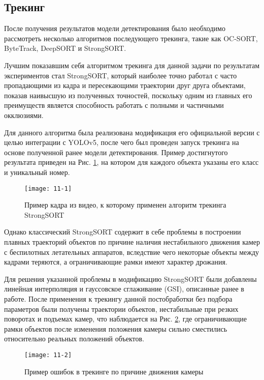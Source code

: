 \subsection{Трекинг}

После получения результатов модели детектирования было необходимо рассмотреть несколько алгоритмов последующего трекинга, такие как OC-SORT, ByteTrack, DeepSORT и StrongSORT.

Лучшим показавшим себя алгоритмом трекинга для данной задачи по результатам экспериментов стал StrongSORT, который наиболее точно работал с часто пропадающими из кадра и пересекающими траектории друг друга объектами, показав наивысшую из полученных точностей, поскольку одним из главных его преимуществ является способность работать с полными и частичными окклюзиями.

Для данного алгоритма была реализована модификация его официальной версии с целью интеграции с YOLOv5, после чего был проведен запуск трекинга на основе полученной ранее модели детектирования. Пример достигнутого результата приведен на Рис. \ref{img:11-1}, на котором для каждого объекта указаны его класс и уникальный номер.

\vspace{0.5cm}

\begin{figure}[ht]
    \centering
    \texttt{[image: 11-1]}
    \caption{Пример кадра из видео, к которому применен алгоритм трекинга StrongSORT}
    \label{img:11-1}
\end{figure}

Однако классический StrongSORT содержит в себе проблемы в построении плавных траекторий объектов по причине наличия нестабильного движения камер с беспилотных летательных аппаратов, вследствие чего некоторые объекты между кадрами теряются, а ограничивающие рамки имеют характер дрожания.

Для решения указанной проблемы в модификацию StrongSORT были добавлены линейная интерполяция и гауссовское сглаживание (GSI), описанные ранее в работе. После применения к трекингу данной постобработки без подбора параметров были получены траектории объектов, нестабильные при резких поворотах и подъемах камер, что наблюдается на Рис. \ref{img:11-2}, где ограничивающие рамки объектов после изменения положения камеры сильно сместились относительно реальных положений объектов.

\vspace{0.5cm}

\begin{figure}[ht]
    \centering
    \texttt{[image: 11-2]}
    \caption{Пример ошибок в трекинге по причине движения камеры}
    \label{img:11-2}
\end{figure}

